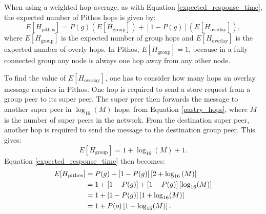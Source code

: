 \documentclass[10pt,a4paper,conference]{IEEEtran}
\begin{document}
When using a weighted hop average, as with Equation \eqref{expected_response_time}, the expected number of Pithos hops is given by:
%
\begin{equation}\label{expected_response_time}
    E[H_{\textrm{pithos}}] = P(g)\left(E\left[H_{\textrm{group}}\right]\right) + \left[1 - P(g)\right]\left(E\left[H_{\textrm{overlay}}\right]\right),
\end{equation}
%
where $E\left[H_{\textrm{group}}\right]$ is the expected number of group hops and $E\left[H_{\textrm{overlay}}\right]$ is the expected number of
overly hops. In Pithos, $E\left[H_{\textrm{group}}\right] = 1$, because in a fully connected group any node is always one hop away from any other
node.

To find the value of $E\left[H_{\textrm{overlay}}\right]$, one has to consider how many hops an overlay message requires in Pithos. One hop is
required to send a store request from a group peer to its super peer. The super peer then forwards the message to another super peer in
$\log_{16}(M)$ hops, from Equation \eqref{pastry_hops}, where $M$ is the number of super peers in the network. From the destination super peer,
another hop is required to send the message to the destination group peer. This gives:
%
\begin{equation}\label{group_hops}
    E\left[H_{\textrm{group}}\right] = 1 + \log_{16}(M) + 1.
\end{equation}
%
Equation \eqref{expected_response_time} then becomes:
%
\begin{align}
E[H_{\textrm{pithos}}] &= P(g) + \left[1 - P(g)\right]\left[2 + \log_{16}\left(M\right)\right]\notag\\
                       &= 1 + \left[1 - P(g)\right] + \left[1 - P(g)\right]\left[\log_{16}(M)\right]\notag\\
                       &= 1 + \left[1 - P(g)\right]\left[1 + \log_{16}(M)\right]\notag\\
                       &= 1 + P(o)\left[1 + \log_{16}(M)\right].\label{expected_response_time_exp}
\end{align}
\end{document}

